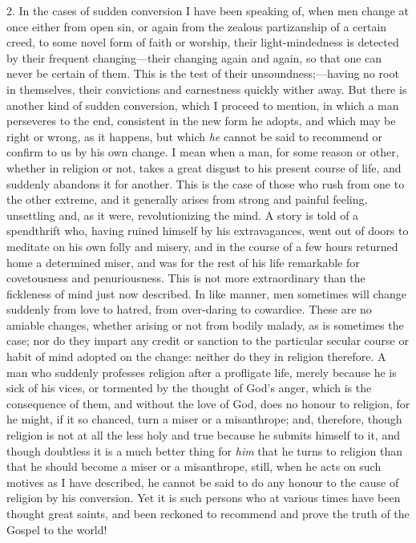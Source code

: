 2. In the cases of sudden conversion I have been speaking of, when
men change at once either from open sin, or again from the zealous
partizanship of a certain creed, to some novel form of faith or
worship, their light-mindedness is detected by their frequent changing—their
changing again and again, so that one can never be certain of them.
This is the test of their unsoundness;—having no root in themselves,
their convictions and earnestness quickly wither away. But there is
another kind of sudden conversion, which I proceed to mention, in
which a man perseveres to the end, consistent in the new form he
adopts, and which may be right or wrong, as it happens, but which \emph{he}
cannot be said to recommend or confirm to us by his own change. I mean
when a man, for some reason or other, whether in religion or not,
takes a great disgust to his present course of life, and suddenly
abandons it for another. This is the case of those who rush from one
to the other extreme, and it generally arises from strong and painful
feeling, unsettling and, as it were, revolutionizing the mind. A story
is told of a spendthrift who, having ruined himself by his
extravagances, went out of doors to meditate on his own folly and
misery, and in the course of a few hours returned home a determined
miser, and was for the rest of his life remarkable for covetousness
and penuriousness. This is not more extraordinary than the fickleness
of mind just now described. In like manner, men sometimes will change
suddenly from love to hatred, from over-daring to cowardice. These are
no amiable changes, whether arising or not from bodily malady, as is
sometimes the case; nor do they impart any credit or sanction to the
particular secular course or habit of mind adopted on the change:
neither do they in religion therefore. A man who suddenly professes
religion after a profligate life, merely because he is sick of his
vices, or tormented by the thought of God's anger, which is the
consequence of them, and without the love of God, does no honour to
religion, for he might, if it so chanced, turn a miser or a
misanthrope; and, therefore, though religion is not at all the less
holy and true because he submits himself to it, and though doubtless
it is a much better thing for \emph{him} that he turns to religion
than that he should become a miser or a misanthrope, still, when he
acts on such motives as I have described, he cannot be said to do any
honour to the cause of religion by his conversion. Yet it is such
persons who at various times have been thought great saints, and been
reckoned to recommend and prove the truth of the Gospel to the world!

